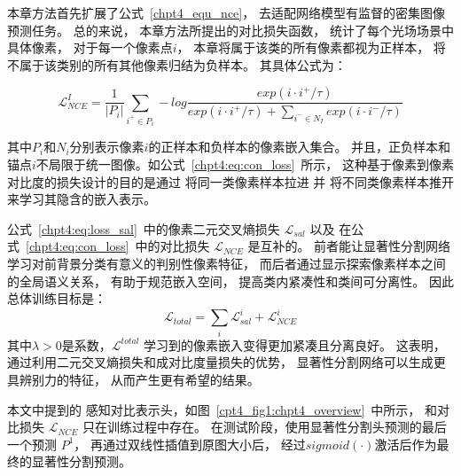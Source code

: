 本章方法首先扩展了公式~\ref{chpt4_equ_nce}，
去适配网络模型有监督的密集图像预测任务。
总的来说，
本章方法所提出的对比损失函数，
统计了每个光场场景中具体像素，
对于每一个像素点$i$，
本章将属于该类的所有像素都视为正样本，
将不属于该类别的所有其他像素归结为负样本。
其具体公式为：



\begin{equation}
	\mathcal{L} _{NCE}^{I}= 
	\frac{1}{|P_{i}|}
	\sum_{i^{+}\in P_{i}}^{}  
	-log \frac
	{exp(i \cdot i^{+ }/\tau )}
	{exp(i \cdot i^{+}/\tau )+ \sum_{i^{-}\in N_{I}} exp(i \cdot i^{-}/\tau )} 
	\label{chpt4:eq:con_loss}
\end{equation}



其中$P_{i}$和$N_{i}$分别表示像素$i$的正样本和负样本的像素嵌入集合。
并且，正负样本和锚点$i$不局限于统一图像。如公式~\ref{chpt4:eq:con_loss}~所示，
这种基于像素到像素对比度的损失设计的目的是通过
将同一类像素样本拉进
并
将不同类像素样本推开来学习其隐含的嵌入表示。





% 
% 
公式~\ref{chpt4:eq:loss_sal}~中的像素二元交叉熵损失
$\mathcal{L}_{sal} $
以及
在公式~\ref{chpt4:eq:con_loss}~中的对比损失
$\mathcal{L}_{NCE} $
是互补的。
前者能让显著性分割网络学习对前背景分类有意义的判别性像素特征，
而后者通过显示探索像素样本之间的全局语义关系，
有助于规范嵌入空间，
提高类内紧凑性和类间可分离性。
因此总体训练目标是：
\begin{equation}
	\mathcal{L}_{total} = \sum_{i}^{} \mathcal{L}_{sal}^{i} + \mathcal{L}_{NCE}^{i}
\end{equation}
% 
% 
% 
% 
其中$\lambda > 0 $是系数，$\mathcal{L}^{total}$
学习到的像素嵌入变得更加紧凑且分离良好。
这表明，通过利用二元交叉熵损失和成对比度量损失的优势，
显著性分割网络可以生成更具辨别力的特征，
从而产生更有希望的结果。












本文中提到的
感知对比表示头，如图~\ref{cpt4_fig1:chpt4_overview}~中所示，
和对比损失 $\mathcal{L}_{NCE}$
只在训练过程中存在。
在测试阶段，使用显著性分割头预测的最后一个预测 $P^{1}$， 再通过双线性插值到原图大小后，
经过$sigmoid(\cdot)$激活后作为最终的显著性分割预测。





